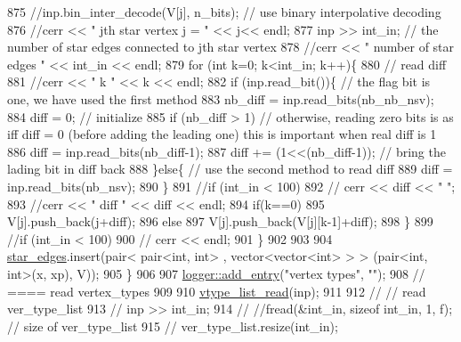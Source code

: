 \begin{DoxyCode}
875       \textcolor{comment}{//inp.bin\_inter\_decode(V[j], n\_bits); // use binary interpolative decoding}
876       \textcolor{comment}{//cerr << "  jth star vertex j = " << j<< endl; }
877       inp >> int\_in; \textcolor{comment}{// the number of star edges connected to jth star vertex}
878       \textcolor{comment}{//cerr << " number of star edges " << int\_in << endl;}
879       \textcolor{keywordflow}{for} (\textcolor{keywordtype}{int} k=0; k<int\_in; k++)\{
880         \textcolor{comment}{// read diff}
881         \textcolor{comment}{//cerr << " k " << k << endl;}
882         \textcolor{keywordflow}{if} (inp.read\_bit())\{ \textcolor{comment}{// the flag bit is one, we have used the first method }
883           nb\_diff = inp.read\_bits(nb\_nb\_nsv);
884           diff = 0; \textcolor{comment}{// initialize}
885           \textcolor{keywordflow}{if} (nb\_diff > 1) \textcolor{comment}{// otherwise, reading zero bits is as iff diff = 0 (before adding the leading
       one) this is important when real diff is 1}
886             diff = inp.read\_bits(nb\_diff-1);
887           diff += (1<<(nb\_diff-1)); \textcolor{comment}{// bring the lading bit in diff back }
888         \}\textcolor{keywordflow}{else}\{ \textcolor{comment}{// use the second method to read diff}
889           diff = inp.read\_bits(nb\_nsv);
890         \}
891         \textcolor{comment}{//if (int\_in < 100)}
892         \textcolor{comment}{//  cerr << diff << " ";}
893         \textcolor{comment}{//cerr << " diff " << diff << endl;}
894         \textcolor{keywordflow}{if}(k==0)
895           V[j].push\_back(j+diff);
896         \textcolor{keywordflow}{else}
897           V[j].push\_back(V[j][k-1]+diff);
898       \}
899       \textcolor{comment}{//if (int\_in < 100)}
900       \textcolor{comment}{//  cerr << endl;}
901     \}
902 
903 
904     \hyperlink{classmarked__graph__compressed_a7df5779d313486644132bd816937f532}{star\_edges}.insert(pair< pair<int, int> , vector<vector<int> > > (pair<int, int>(x, xp), V));
905   \}
906 
907   \hyperlink{classlogger_a710163deb17bc81f70d53d285b8ac9ac}{logger::add\_entry}(\textcolor{stringliteral}{"vertex types"}, \textcolor{stringliteral}{""});
908   \textcolor{comment}{// ==== read vertex\_types}
909 
910   \hyperlink{classmarked__graph__compressed_af29f16cbd56583652118eb24a7c233b7}{vtype\_list\_read}(inp);
911 
912   \textcolor{comment}{// // read ver\_type\_list}
913   \textcolor{comment}{// inp >> int\_in;}
914   \textcolor{comment}{// //fread(&int\_in, sizeof int\_in, 1, f); // size of ver\_type\_list}
915   \textcolor{comment}{// ver\_type\_list.resize(int\_in);}

\end{DoxyCode}
